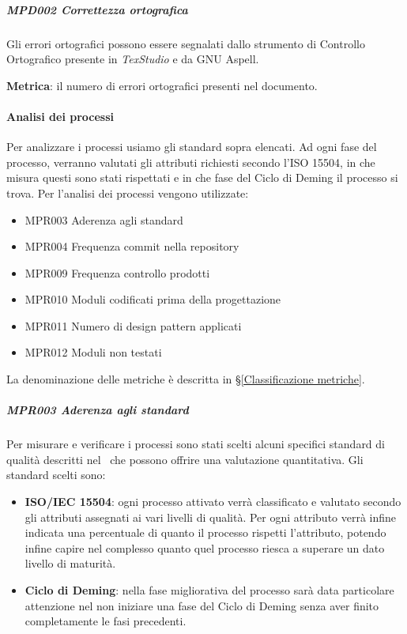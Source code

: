 			\subparagraph{MPD002 Correttezza ortografica}\label{AnalisiStatica:CorrettezzaOrtografica}
			Gli errori ortografici possono essere segnalati dallo strumento di Controllo Ortografico presente in \textit{TexStudio} e da GNU Aspell.

			\textbf{Metrica}: il numero di errori ortografici presenti nel documento.


			\paragraph{Analisi dei processi}\label{analisipr}
			Per analizzare i processi usiamo gli standard sopra elencati. Ad ogni fase del processo, verranno valutati gli attributi richiesti secondo
			l'ISO 15504, in che misura questi sono stati rispettati e in che fase del Ciclo di Deming il processo si trova.
			Per l'analisi dei processi vengono utilizzate:

			\begin{itemize}
                \item MPR003 Aderenza agli standard
				\item MPR004 Frequenza commit nella repository
				\item MPR009 Frequenza controllo prodotti
				\item MPR010 Moduli codificati prima della progettazione
                \item MPR011 Numero di design pattern applicati
                \item MPR012 Moduli non testati
			\end{itemize}

			La denominazione delle metriche è descritta in \S\ref{Classificazione metriche}.

            \subparagraph{MPR003 Aderenza agli standard}
            Per misurare e verificare i processi sono stati scelti alcuni specifici standard di qualità descritti nel \PdQd\ che possono offrire una valutazione quantitativa.
            Gli standard scelti sono:

            \begin{itemize}
                \item \textbf{ISO/IEC 15504}: ogni processo attivato verrà classificato e valutato secondo gli attributi assegnati ai vari livelli di qualità. Per ogni attributo verrà infine indicata una percentuale di quanto il processo rispetti l'attributo, potendo infine capire nel complesso quanto quel processo riesca a superare un dato livello di maturità.
                \item \textbf{Ciclo di Deming}: nella fase migliorativa del processo sarà data particolare attenzione nel non iniziare una fase del Ciclo di Deming senza aver finito completamente le fasi precedenti.
            \end{itemize}

